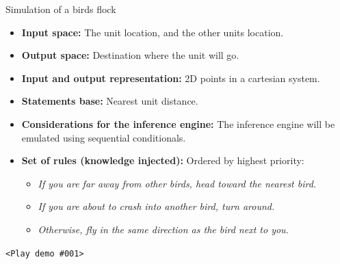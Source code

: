 \documentclass[10pt]{beamer}
\begin{document}
	    \begin{frame}{Simulation of a birds flock}
	    \small
	      \begin{itemize}
	      \item \textbf{Input space:} The unit location, and the other units location.
	      \item \textbf{Output space:} Destination where the unit will go.
	      \item \textbf{Input and output representation:} 2D points in a cartesian system.
	      \item \textbf{Statements base:} Nearest unit distance.
	      \item \textbf{Considerations for the inference engine:} The inference engine will be emulated using sequential conditionals.
	      \item \textbf{Set of rules (knowledge injected):} Ordered by highest priority:\newline
		  \begin{itemize}
		    \footnotesize
		    \item \textit{If you are far away from other birds, head toward the nearest bird.}
		    \item \textit{If you are about to crash into another bird, turn around.}
		    \item \textit{Otherwise, fly in the same direction as the bird next to you.}\newline
		  \end{itemize}
	      
	      \end{itemize}
	    \begin{center} 
	    \texttt{<Play demo \#001>}	     
	    \end{center}

	    \end{frame}
\end{document}
